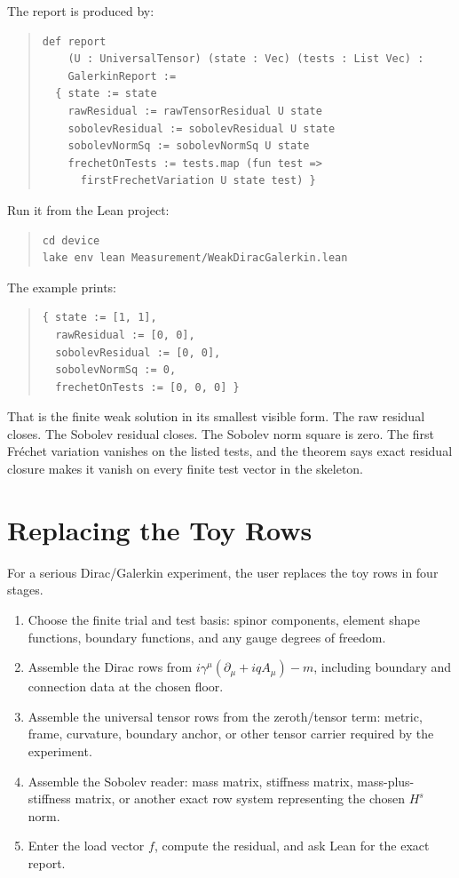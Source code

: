 The report is produced by:

\begin{quote}\small
\begin{verbatim}
def report
    (U : UniversalTensor) (state : Vec) (tests : List Vec) :
    GalerkinReport :=
  { state := state
    rawResidual := rawTensorResidual U state
    sobolevResidual := sobolevResidual U state
    sobolevNormSq := sobolevNormSq U state
    frechetOnTests := tests.map (fun test =>
      firstFrechetVariation U state test) }
\end{verbatim}
\end{quote}

Run it from the Lean project:

\begin{quote}\small
\begin{verbatim}
cd device
lake env lean Measurement/WeakDiracGalerkin.lean
\end{verbatim}
\end{quote}

The example prints:

\begin{quote}\small
\begin{verbatim}
{ state := [1, 1],
  rawResidual := [0, 0],
  sobolevResidual := [0, 0],
  sobolevNormSq := 0,
  frechetOnTests := [0, 0, 0] }
\end{verbatim}
\end{quote}

That is the finite weak solution in its smallest visible form. The raw residual closes. The Sobolev residual
closes. The Sobolev norm square is zero. The first Fréchet variation vanishes on the listed tests, and the
theorem says exact residual closure makes it vanish on every finite test vector in the skeleton.

\section{Replacing the Toy Rows}

For a serious Dirac/Galerkin experiment, the user replaces the toy rows in four stages.

\begin{enumerate}
\item Choose the finite trial and test basis: spinor components, element shape functions, boundary functions,
and any gauge degrees of freedom.
\item Assemble the Dirac rows from \(i\gamma^\mu(\partial_\mu+iqA_\mu)-m\), including boundary and connection
data at the chosen floor.
\item Assemble the universal tensor rows from the zeroth/tensor term: metric, frame, curvature, boundary
anchor, or other tensor carrier required by the experiment.
\item Assemble the Sobolev reader: mass matrix, stiffness matrix, mass-plus-stiffness matrix, or another exact
row system representing the chosen \(H^s\) norm.
\item Enter the load vector \(f\), compute the residual, and ask Lean for the exact report.
\end{enumerate}

